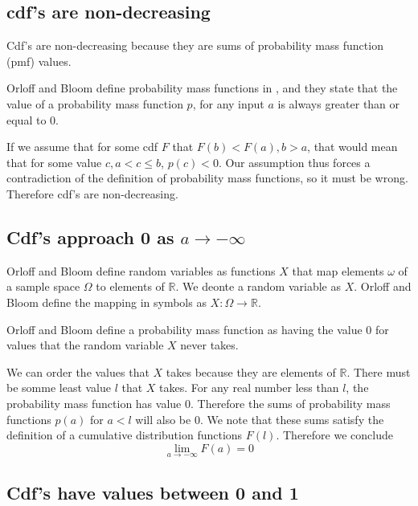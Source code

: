 \documentclass[a4paper,11pt]{article}
\begin{document}
\subsection{cdf's are non-decreasing}

Cdf's are non-decreasing because they are sums of probability mass
function (pmf) values.

Orloff and Bloom define probability mass functions in \cite{reading4}, 
and they state that the value of a probability mass function $p$,
for any input $a$ is always greater than or equal to 0.

If we assume that for some cdf $F$ that $F \left( b \right) <
F \left(a \right), b > a$, that would mean that for some value
$c, a < c \leq b$, $p\left( c \right) < 0$.  Our assumption thus
forces a contradiction of the definition of probability mass functions,
so it must be wrong.  Therefore cdf's are non-decreasing.

\subsection{Cdf's approach 0 as $a \rightarrow -\infty$}

Orloff and Bloom define random variables as functions $X$ that
map elements $\omega$ of a sample space $\Omega$ to elements of
$\mathbb{R}$. We deonte a random variable as $X$.  Orloff and Bloom
define the mapping in symbols as $X : \Omega \rightarrow \mathbb{R}$.

Orloff and Bloom define a probability mass function as having the
value 0 for values that the random variable $X$ never takes.

We can order the values that $X$ takes because they are elements of
$\mathbb{R}$.  There must be somme  least value $l$ that $X$ takes.
For any real number less than $l$, the probability mass function
has value $0$.  Therefore the sums of probability mass functions 
$p\left( a \right)$ for $a < l$ will also be $0$.  We note that
these sums satisfy the definition of a cumulative distribution functions
$F \left( l \right)$. Therefore we conclude
\begin{equation}
  \lim_{a \rightarrow -\infty} F \left( a \right) = 0
\end{equation}



\subsection{Cdf's have values between 0 and 1}
\end{document}
